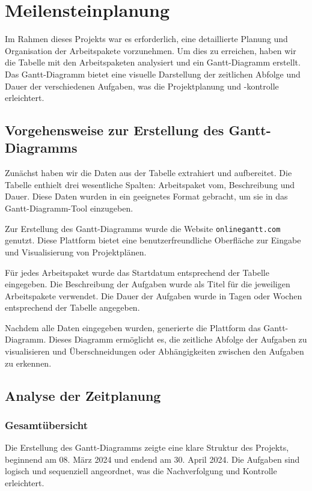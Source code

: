 \chapter{Meilensteinplanung}
Im Rahmen dieses Projekts war es erforderlich, eine detaillierte Planung und Organisation der Arbeitspakete vorzunehmen. Um dies zu erreichen, haben wir die Tabelle mit den Arbeitspaketen analysiert und ein Gantt-Diagramm erstellt. Das Gantt-Diagramm bietet eine visuelle Darstellung der zeitlichen Abfolge und Dauer der verschiedenen Aufgaben, was die Projektplanung und -kontrolle erleichtert.

\section{Vorgehensweise zur Erstellung des Gantt-Diagramms}

Zunächst haben wir die Daten aus der Tabelle extrahiert und aufbereitet. Die Tabelle enthielt drei wesentliche Spalten: Arbeitspaket vom, Beschreibung und Dauer. Diese Daten wurden in ein geeignetes Format gebracht, um sie in das Gantt-Diagramm-Tool einzugeben.

Zur Erstellung des Gantt-Diagramms wurde die Website \texttt{onlinegantt.com} genutzt. Diese Plattform bietet eine benutzerfreundliche Oberfläche zur Eingabe und Visualisierung von Projektplänen.

Für jedes Arbeitspaket wurde das Startdatum entsprechend der Tabelle eingegeben. Die Beschreibung der Aufgaben wurde als Titel für die jeweiligen Arbeitspakete verwendet. Die Dauer der Aufgaben wurde in Tagen oder Wochen entsprechend der Tabelle angegeben.

Nachdem alle Daten eingegeben wurden, generierte die Plattform das Gantt-Diagramm. Dieses Diagramm ermöglicht es, die zeitliche Abfolge der Aufgaben zu visualisieren und Überschneidungen oder Abhängigkeiten zwischen den Aufgaben zu erkennen.

\section{Analyse der Zeitplanung}
\subsection{Gesamtübersicht}
Die Erstellung des Gantt-Diagramms zeigte eine klare Struktur des Projekts, beginnend am 08. März 2024 und endend am 30. April 2024. Die Aufgaben sind logisch und sequenziell angeordnet, was die Nachverfolgung und Kontrolle erleichtert.

